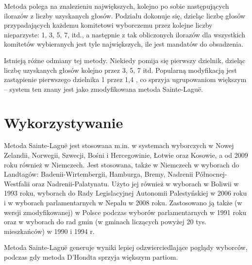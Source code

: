 \documentclass[12pt,a4paper,titlepage]{report}
\begin{document}
Metoda polega na znalezieniu największych, kolejno po sobie następujących ilorazów z liczby uzyskanych głosów. Podziału dokonuje się, dzieląc liczbę głosów przypadających każdemu komitetowi wyborczemu przez kolejne liczby nieparzyste: 1, 3, 5, 7, itd., a następnie z tak obliczonych ilorazów dla wszystkich komitetów wybieranych jest tyle największych, ile jest mandatów do obsadzenia.

Istnieją różne odmiany tej metody. Niekiedy pomija się pierwszy dzielnik, dzieląc liczbę uzyskanych głosów kolejno przez 3, 5, 7 itd. Popularną modyfikacją jest zastąpienie pierwszego dzielnika 1 przez 1,4 , co sprzyja ugrupowaniom większym – system ten znany jest jako zmodyfikowana metoda Sainte-Laguë.
\section{Wykorzystywanie}
Metoda Sainte-Laguë jest stosowana m.in. w systemach wyborczych w Nowej Zelandii, Norwegii, Szwecji, Bośni i Hercegowinie, Łotwie oraz Kosowie, a od 2009 roku również w Niemczech. Jest stosowana, także w Niemczech w wyborach do Landtagów: Badenii-Wirtembergii, Hamburga, Bremy, Nadrenii Północnej-Westfalii oraz Nadrenii-Palatynatu. Użyto jej również w wyborach w Boliwii w 1993 roku, wyborach do Rady Legislacyjnej Autonomii Palestyńskiej w 2006 roku i w wyborach parlamentarnych w Nepalu w 2008 roku. Zastosowano ją także (w wersji zmodyfikowanej) w Polsce podczas wyborów parlamentarnych w 1991 roku oraz w wyborach do rad gmin (w gminach liczących powyżej 20 tys. mieszkańców) w 1990 i 1994 r.

Metoda Sainte-Laguë generuje wyniki lepiej odzwierciedlające poglądy wyborców, podczas gdy metoda D’Hondta sprzyja większym partiom.
\end{document}
